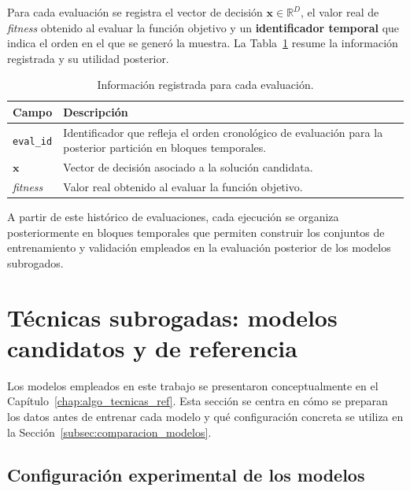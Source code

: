 Para cada evaluación se registra el vector de decisión
\(\mathbf{x} \in \mathbb{R}^{D}\), el valor real de \textit{fitness} obtenido al
evaluar la función objetivo y un \textbf{identificador temporal} que indica el orden en el que se generó la muestra. La Tabla~\ref{tab:estructura_trayectorias}
resume la información registrada y su utilidad posterior.

\begin{table}[H]
    \centering
    \begin{tabular}{l p{9.4cm}}
        \toprule
        \textbf{Campo} & \textbf{Descripción}                                                                                            \\
        \midrule
        \texttt{eval\_id}
                       & Identificador que refleja el orden cronológico de evaluación para la posterior partición en bloques temporales. \\
        \midrule
        \(\mathbf{x}\)
                       & Vector de decisión asociado a la solución candidata.                                                            \\
        \midrule
        \textit{fitness}
                       & Valor real obtenido al evaluar la función objetivo.                                                             \\
        \bottomrule
    \end{tabular}
    \caption{Información registrada para cada evaluación.}
    \label{tab:estructura_trayectorias}
\end{table}

A partir de este histórico de evaluaciones, cada ejecución se organiza posteriormente en bloques temporales que permiten construir los conjuntos de entrenamiento y validación empleados en la evaluación posterior de los modelos subrogados.

\section{Técnicas subrogadas: modelos candidatos y de referencia}

Los modelos empleados en este trabajo se presentaron conceptualmente en el Capítulo~\ref{chap:algo_tecnicas_ref}. Esta sección se centra en cómo se preparan los datos antes de entrenar cada modelo y qué configuración concreta se utiliza en la Sección~\ref{subsec:comparacion_modelos}.

\subsection{Configuración experimental de los modelos}

